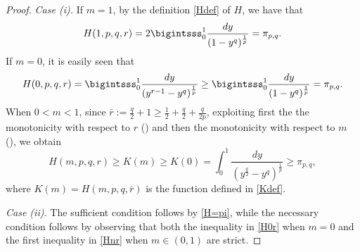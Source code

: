 \documentclass{amsart}
\theoremstyle{definition}
\newtheorem{rem}[thm]{Remark}
\theoremstyle{remark}
\begin{document}
\begin{proof}
{\it Case (i).}
If $m=1$, by the definition \eqref{Hdef} of $H$, we have that
\begin{equation}
\label{H=pi}H(1,p,q,r)=2\bigintsss_0^1\frac{dy}{(1-y^q)^\frac1p}=\pi_{p,q}.%
\end{equation}
If $m=0$, it is easily seen that
\begin{equation}\label{H0r}
H(0,p,q,r)=\bigintsss_0^1\frac{dy}{(y^{r-1}-y^q)^\frac1p}\geq \bigintsss_0^1\frac{dy}{(1-y^q)^\frac1p}=\pi_{p,q}.
\end{equation}
When $0<m<1$, since $\bar r:=\frac q2 +1\geq\frac 12+\frac q2 +\frac q{2p}$, exploiting first the  the monotonicity with respect to $r$ () and then the monotonicity with respect to $m$ (), we obtain
 \begin{equation}
 \label{Hnr}
 H(m,p,q,r)\geq K(m) \ge K(0)=\int_0^1\frac{dy}{(y^{\frac q 2}-y^q)^\frac1p}\geq \pi_{p,q},
  \end{equation}
  where $K(m)=H(m,p,q,\bar r)$ is the function defined in \eqref{Kdef}.
  
{\it Case (ii).} The sufficient condition follows by \eqref{H=pi}, while the necessary condition follows by observing that  both the inequality in \eqref{H0r} when $m=0$ and the first inequality in \eqref{Hnr} when $m\in (0,1)$ are strict.
\end{proof}


\end{document}
